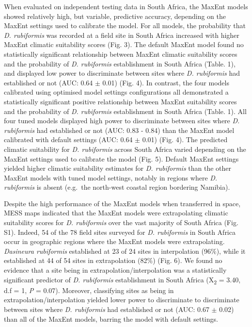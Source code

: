 \documentclass[12pt,]{article}
\begin{document}
When evaluated on independent testing data in South Africa, the MaxEnt
models showed relatively high, but variable, predictive accuracy,
depending on the MaxEnt settings used to calibrate the model. For all
models, the probability that \emph{D. rubiformis} was recorded at a
field site in South Africa increased with higher MaxEnt climatic
suitability scores (Fig. 3). The default MaxEnt model found no
statistically significant relationship between MaxEnt climatic
suitability scores and the probability of \emph{D. rubiformis}
establishment in South Africa (Table. 1), and displayed low power to
discriminate between sites where \emph{D. rubiformis} had established or
not (AUC: 0.64 \(\pm\) 0.01) (Fig. 4). In contrast, the four models
calibrated using optimised model settings configurations all
demonstrated a statistically significant positive relationship between
MaxEnt suitability scores and the probability of \emph{D. rubiformis}
establishment in South Africa (Table. 1). All four tuned models
displayed high power to discriminate between sites where \emph{D.
rubiformis} had established or not (AUC: 0.83 - 0.84) than the MaxEnt
model calibrated with default settings (AUC: 0.64 \(\pm\) 0.01) (Fig.
4). The predicted climatic suitability for \emph{D. rubiformis} across
South Africa varied depending on the MaxEnt settings used to calibrate
the model (Fig. 5). Default MaxEnt settings yielded higher climatic
suitability estimates for \emph{D. rubiformis} than the other MaxEnt
models with tuned model settings, notably in regions where \emph{D.
rubiformis} is absent (e.g.~the north-west coastal region bordering
Namibia).

Despite the high performance of the MaxEnt models when transferred in
space, MESS maps indicated that the MaxEnt models were extrapolating
climatic suitability scores for \emph{D. rubiformis} over the vast
majority of South Africa (Fig. S1). Indeed, 54 of the 78 field sites
surveyed for \emph{D. rubiformis} in South Africa occur in geographic
regions where the MaxEnt models were extrapolating. \emph{Dasineura
rubiformis} established at 23 of 24 sites in interpolation (96\%), while
it established at 44 of 54 sites in extrapolation (82\%) (Fig. 6). We
found no evidence that a site being in extrapolation/interpolation was a
statistically significant predictor of \emph{D. rubiformis}
establishment in South Africa (X\textsubscript{2} = 3.40, d.f = 1,
\emph{P} = 0.07). Moreover, classifying sites as being in
extrapolation/interpolation yielded lower power to discriminate to
discriminate between sites where \emph{D. rubiformis} had established or
not (AUC: 0.67 \(\pm\) 0.02) than all of the MaxEnt models, barring the
model with default settings.
\end{document}
